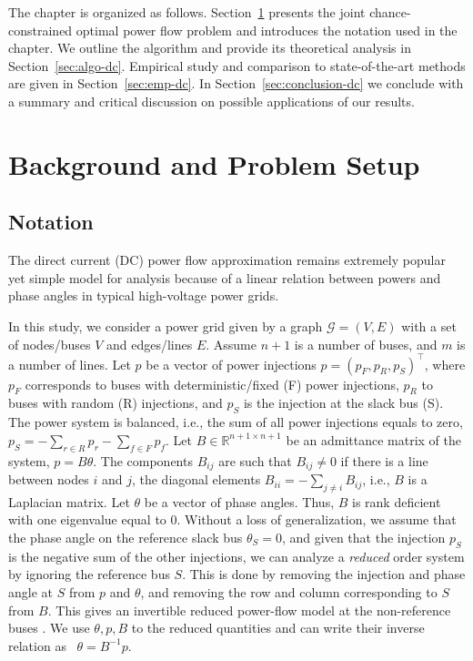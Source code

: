 The chapter is organized as follows.
Section~\ref{sec:not-dc} presents the joint chance-constrained optimal power flow problem and introduces the notation used in the chapter. We outline the algorithm and provide its theoretical analysis in Section~\ref{sec:algo-dc}. Empirical study and comparison to state-of-the-art methods are given in Section~\ref{sec:emp-dc}. In Section~\ref{sec:conclusion-dc} we conclude with a summary and critical discussion on possible applications of our results.



\section{Background and Problem Setup}\label{sec:not-dc}

\subsection{Notation}
The direct current (DC) power flow approximation remains extremely popular yet simple model for analysis because of a linear relation between powers and phase angles in typical high-voltage power grids. 

In this study, we consider a power grid given by a graph $\mathcal{G} = (V, E)$ with a set of nodes/buses $V$ and edges/lines $E$. Assume $n+1$ is a number of buses, and $m$ is a number of lines. Let $p$ be a vector of power injections $p = (p_F, p_R, p_S)^\top$, where $p_F$ corresponds to buses with deterministic/fixed (F) power injections, $p_R$ to buses with random (R) injections, and $p_S$ is the injection at the slack bus (S). The power system is balanced, i.e., the sum of all power injections equals to zero, $p_S = -\sum_{r\in R} p_r - \sum_{f\in F} p_f$. Let $B \in \mathbb{R}^{n+1 \times n+1}$ be an admittance matrix of the system, $p = B\theta$. The components $B_{ij}$ are such that $B_{ij} \neq 0$ if there is a line between nodes $i$ and $j$, the diagonal elements $B_{ii} = - \sum_{j\neq i} B_{ij}$, i.e., $B$ is a Laplacian matrix. Let $\theta$ be a vector of phase angles. Thus, $B$ is rank deficient with one eigenvalue equal to $0$. Without a loss of generalization, we assume that the phase angle on the reference slack bus $\theta_S = 0$, and given that the injection $p_S$ is the negative sum of the other injections, we can analyze a \textit{reduced} order system by ignoring the reference bus $S$. This is done by removing the injection and phase angle at $S$ from $p$ and $\theta$, and removing the row and column corresponding to $S$ from $B$. This gives an invertible reduced power-flow model at the non-reference buses \cite{aburbook,dekatcns}. We use $\theta, p, B$ to the reduced quantities and can write their inverse relation as ~$\theta = B^{-1} p$.

